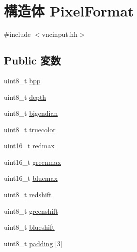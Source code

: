 \hypertarget{structVncInput_1_1PixelFormat}{
\section{構造体 PixelFormat}
\label{structVncInput_1_1PixelFormat}
}


{\ttfamily \#include $<$vncinput.hh$>$}\subsection*{Public 変数}
\begin{DoxyCompactItemize}
\item 
uint8\_\-t \hyperlink{structVncInput_1_1PixelFormat_a496818f626ceb32365ca6cf57c991979}{bpp}
\item 
uint8\_\-t \hyperlink{structVncInput_1_1PixelFormat_ab6f276082172be43a6041212071e377b}{depth}
\item 
uint8\_\-t \hyperlink{structVncInput_1_1PixelFormat_a4d868ea999e3357d3046b00014455b6e}{bigendian}
\item 
uint8\_\-t \hyperlink{structVncInput_1_1PixelFormat_ab14b7ec53c8b8d397a4abb2c61f3dde6}{truecolor}
\item 
uint16\_\-t \hyperlink{structVncInput_1_1PixelFormat_a55af395a54c61a9e6118f09dfbcaa45e}{redmax}
\item 
uint16\_\-t \hyperlink{structVncInput_1_1PixelFormat_ae8bacdd4bc66c207a91914a5eb0fb1c9}{greenmax}
\item 
uint16\_\-t \hyperlink{structVncInput_1_1PixelFormat_adfda5ca4cddee763bdf6c78777593328}{bluemax}
\item 
uint8\_\-t \hyperlink{structVncInput_1_1PixelFormat_ae651b46b775055134b81e5055203facf}{redshift}
\item 
uint8\_\-t \hyperlink{structVncInput_1_1PixelFormat_ae51a571c5df8d325edb011c3c93532c2}{greenshift}
\item 
uint8\_\-t \hyperlink{structVncInput_1_1PixelFormat_afbb2c2bc76b4cc4e8552fc47403c4786}{blueshift}
\item 
uint8\_\-t \hyperlink{structVncInput_1_1PixelFormat_a735ef00341a84c02ba561c66de3d20af}{padding} \mbox{[}3\mbox{]}
\end{DoxyCompactItemize}


